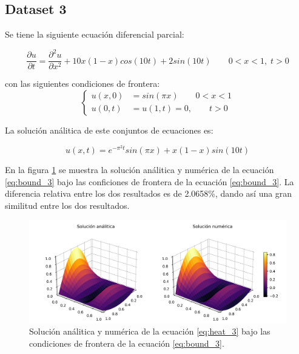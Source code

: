 \subsection{Dataset 3}

Se tiene la siguiente ecuación diferencial parcial:

\begin{equation}
    \frac{\partial u}{\partial t} = \frac{\partial^2 u}{\partial x^2}+10x(1-x)cos(10t)+2sin(10t)\qquad 0<x<1, \; t>0 \label{eq:heat_3}
\end{equation}

con las siguientes condiciones de frontera:
\begin{equation}
    \begin{cases}
        u(x,0) & = sin(\pi x) \qquad 0<x<1 \\
        u(0,t) & =u(1,t) = 0, \qquad t>0
    \end{cases} \label{eq:bound_3}
\end{equation}

La solución análitica de este conjuntos de ecuaciones es:

\begin{equation}
    u(x,t)= e^{-\pi^2 t}sin(\pi x)+x(1-x)sin(10t) \label{eq:sol_3}
\end{equation}

En la figura \ref{fig:sol_3} se muestra la solución análitica y numérica de la ecuación \ref{eq:bound_3} bajo las conficiones de frontera de la ecuación \ref{eq:bound_3}. La diferencia relativa entre los dos resultados es de 2.0658\%, dando así una gran similitud entre los dos resultados.

\begin{figure}[H]
    \centering
    \includegraphics[width=16cm]{Graphics/surface_1.png}
    \caption{Solución análitica y numérica de la ecuación \ref{eq:heat_3} bajo las condiciones de frontera de la ecuación \ref{eq:bound_3}.}
    \label{fig:sol_3}
\end{figure}


